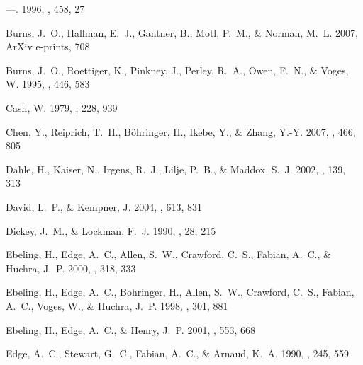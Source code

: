 \documentclass[12pt,preprint]{aastex}
\begin{document}
\begin{thebibliography}{83}
---. 1996, \apj, 458, 27

{Burns}, J.~O., {Hallman}, E.~J., {Gantner}, B., {Motl}, P.~M., \& {Norman},
  M.~L. 2007, ArXiv e-prints, 708

{Burns}, J.~O., {Roettiger}, K., {Pinkney}, J., {Perley}, R.~A., {Owen}, F.~N.,
  \& {Voges}, W. 1995, \apj, 446, 583

{Cash}, W. 1979, \apj, 228, 939

{Chen}, Y., {Reiprich}, T.~H., {B{\"o}hringer}, H., {Ikebe}, Y., \& {Zhang},
  Y.-Y. 2007, \aap, 466, 805

{Dahle}, H., {Kaiser}, N., {Irgens}, R.~J., {Lilje}, P.~B., \& {Maddox}, S.~J.
  2002, \apjs, 139, 313

{David}, L.~P., \& {Kempner}, J. 2004, \apj, 613, 831

{Dickey}, J.~M., \& {Lockman}, F.~J. 1990, \araa, 28, 215

{Ebeling}, H., {Edge}, A.~C., {Allen}, S.~W., {Crawford}, C.~S., {Fabian},
  A.~C., \& {Huchra}, J.~P. 2000, \mnras, 318, 333

{Ebeling}, H., {Edge}, A.~C., {Bohringer}, H., {Allen}, S.~W., {Crawford},
  C.~S., {Fabian}, A.~C., {Voges}, W., \& {Huchra}, J.~P. 1998, \mnras, 301,
  881

{Ebeling}, H., {Edge}, A.~C., \& {Henry}, J.~P. 2001, \apj, 553, 668

{Edge}, A.~C., {Stewart}, G.~C., {Fabian}, A.~C., \& {Arnaud}, K.~A. 1990,
  \mnras, 245, 559


\end{thebibliography}
\end{document}
